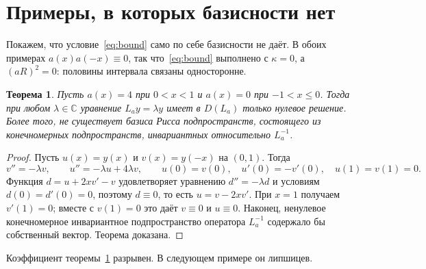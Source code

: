 \documentclass[12pt,a4paper]{article}
\newtheorem{theorem}{Теорема}
\theoremstyle{definition}
\renewcommand{\C}{\mathbb C}
\begin{document}
\section{Примеры, в которых базисности нет}\label{sec:examples}
Покажем, что условие~\eqref{eq:bound} само по себе базисности не даёт. В обоих примерах
$a(x)a(-x)\equiv0$, так что~\eqref{eq:bound} выполнено с $\kappa=0$, а $(aR)^2=0$:
половины интервала связаны односторонне.

\begin{theorem}\label{th:onesided}
Пусть $a(x)=4$ при $0<x<1$ и $a(x)=0$ при $-1<x\le0$. Тогда при любом $\lambda\in\C$
уравнение $L_ay=\lambda y$ имеет в $D(L_a)$ только нулевое решение. Более того, не
существует базиса Рисса подпространств, состоящего из конечномерных подпространств,
инвариантных относительно $L_a^{-1}$.
\end{theorem}
\begin{proof}
Пусть $u(x)=y(x)$ и $v(x)=y(-x)$ на $(0,1)$. Тогда
\[
 v''=-\lambda v,\qquad u''=-\lambda u+4\lambda v,\qquad
 u(0)=v(0),\quad u'(0)=-v'(0),\quad u(1)=v(1)=0 .
\]
Функция $d=u+2xv'-v$ удовлетворяет уравнению $d''=-\lambda d$ и условиям
$d(0)=d'(0)=0$, поэтому $d\equiv0$, то есть $u=v-2xv'$. При $x=1$ получаем $v'(1)=0$;
вместе с $v(1)=0$ это даёт $v\equiv0$ и $u\equiv0$. Наконец, ненулевое конечномерное
инвариантное подпространство оператора $L_a^{-1}$ содержало бы собственный вектор.
Теорема доказана.
\end{proof}
Коэффициент теоремы~\ref{th:onesided} разрывен. В следующем примере он липшицев.
\end{document}
